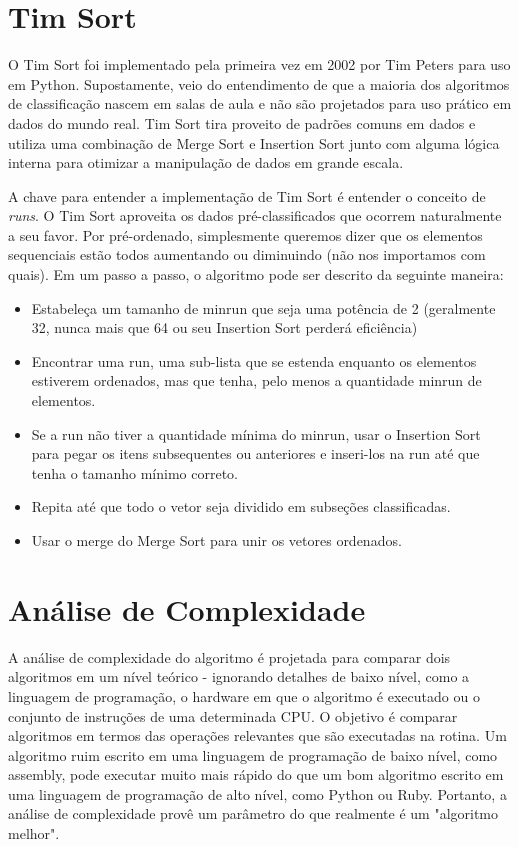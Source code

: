 \section{Tim Sort}

O Tim Sort foi implementado pela primeira vez em 2002 por Tim Peters para uso em Python. Supostamente, veio do entendimento de que a maioria dos algoritmos de classificação nascem em salas de aula e não são projetados para uso prático em dados do mundo real. Tim Sort tira proveito de padrões comuns em dados e utiliza uma combinação de Merge Sort e Insertion Sort junto com alguma lógica interna para otimizar a manipulação de dados em grande escala.

A chave para entender a implementação de Tim Sort é entender o conceito de \textit{runs}. O Tim Sort aproveita os dados pré-classificados que ocorrem naturalmente a seu favor. Por pré-ordenado, simplesmente queremos dizer que os elementos sequenciais estão todos aumentando ou diminuindo (não nos importamos com quais). Em um passo a passo, o algoritmo pode ser descrito da seguinte maneira:

\begin{itemize}

\item Estabeleça um tamanho de minrun que seja uma potência de 2 (geralmente 32, nunca mais que 64 ou seu Insertion Sort perderá eficiência)
\item Encontrar uma run, uma sub-lista que se estenda enquanto os elementos estiverem ordenados, mas que tenha, pelo menos a quantidade minrun de elementos.
\item Se a run não tiver a quantidade mínima do minrun, usar o Insertion Sort para pegar os itens subsequentes ou anteriores e inseri-los na run até que tenha o tamanho mínimo correto.
\item Repita até que todo o vetor seja dividido em subseções classificadas.
\item Usar o merge do Merge Sort para unir os vetores ordenados. 


\end{itemize}

\section{Análise de Complexidade}

A análise de complexidade do algoritmo é projetada para comparar dois algoritmos em um nível teórico - ignorando detalhes de baixo nível, como a linguagem de programação, o hardware em que o algoritmo é executado ou o conjunto de instruções de uma determinada CPU. O objetivo é comparar algoritmos em termos das operações relevantes que são executadas na rotina. Um algoritmo ruim escrito em uma linguagem de programação de baixo nível, como assembly, pode executar muito mais rápido do que um bom algoritmo escrito em uma linguagem de programação de alto nível, como Python ou Ruby. Portanto, a análise de complexidade provê um parâmetro do que realmente é um "algoritmo melhor". 

